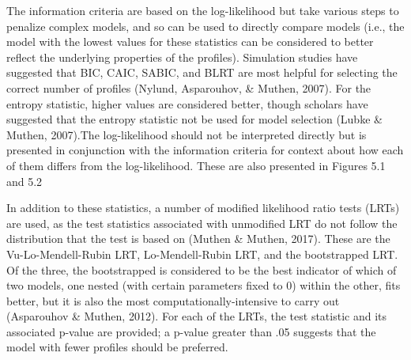 \documentclass[]{msu-thesis}
\theoremstyle{definition}
\theoremstyle{definition}
\theoremstyle{definition}
\theoremstyle{remark}
\begin{document}
The information criteria are based on the log-likelihood but take
various steps to penalize complex models, and so can be used to directly
compare models (i.e., the model with the lowest values for these
statistics can be considered to better reflect the underlying properties
of the profiles). Simulation studies have suggested that BIC, CAIC,
SABIC, and BLRT are most helpful for selecting the correct number of
profiles (Nylund, Asparouhov, \& Muthen, 2007). For the entropy
statistic, higher values are considered better, though scholars have
suggested that the entropy statistic not be used for model selection
(Lubke \& Muthen, 2007).The log-likelihood should not be interpreted
directly but is presented in conjunction with the information criteria
for context about how each of them differs from the log-likelihood.
These are also presented in Figures 5.1 and 5.2

In addition to these statistics, a number of modified likelihood ratio
tests (LRTs) are used, as the test statistics associated with unmodified
LRT do not follow the distribution that the test is based on (Muthen \&
Muthen, 2017). These are the Vu-Lo-Mendell-Rubin LRT, Lo-Mendell-Rubin
LRT, and the bootstrapped LRT. Of the three, the bootstrapped is
considered to be the best indicator of which of two models, one nested
(with certain parameters fixed to 0) within the other, fits better, but
it is also the most computationally-intensive to carry out (Asparouhov
\& Muthen, 2012). For each of the LRTs, the test statistic and its
associated p-value are provided; a p-value greater than .05 suggests
that the model with fewer profiles should be preferred.
\end{document}
